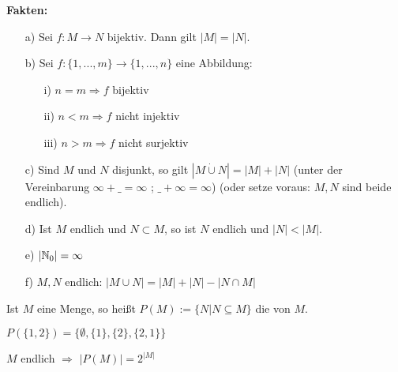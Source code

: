 \noindent\textbf{Fakten:}
\begin{itemize}
	\item[a)] Sei $f:M\rightarrow N$ bijektiv. Dann gilt $|M|=|N|$.
	\item[b)] Sei $f:\{1,...,m\}\rightarrow\{1,...,n\}$ eine Abbildung:
	\begin{itemize}
		\item[i)] $n=m\Rightarrow f$ bijektiv
		\item[ii)] $n<m\Rightarrow f$ nicht injektiv
		\item[iii)] $n>m\Rightarrow f$ nicht surjektiv
	\end{itemize}
	\item[c)] Sind $M$ und $N$ disjunkt, so gilt $|M\mathbin{\dot{\cup}}N|=|M|+|N|$ (unter der Vereinbarung $\infty+\_=\infty$ ; $\_+\infty=\infty$) (oder setze voraus: $M,N$ sind beide endlich).
	\item[d)] Ist $M$ endlich und $N\subset M$, so ist $N$ endlich und $|N|<|M|$.
	\item[e)] $|\mathbb{N}_{0}|=\infty$
	\item[f)] $M,N$ endlich: $|M\cup N|=|M|+|N|-|N\cap M|$
\end{itemize}

\begin{defi}
	Ist $M$ eine Menge, so heißt $P(M):=\{N|N\subseteq M\}$ die  von $M$.\
\end{defi}

\begin{bsp}
	$P(\{1,2\})=\{\emptyset,\{1\},\{2\},\{2,1\}\}$
\end{bsp}

\begin{satz}
	$M$ endlich $\Rightarrow$ $|P(M)|=2^{|M|}$
\end{satz}